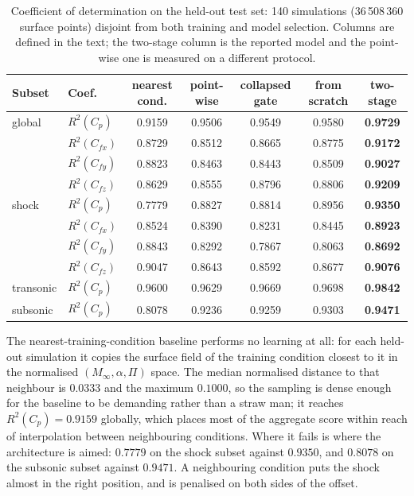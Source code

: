 \documentclass{WCCM-ECCOMAS_2026_Full_Paper}
\begin{document}
\begin{table}[htbp]
\centering
\caption{Coefficient of determination on the held-out test set: 140
  simulations (36\,508\,360 surface points) disjoint from both
  training and model selection.  Columns are defined in the text; the
  two-stage column is the reported model and the point-wise one is
  measured on a different protocol.}
\label{tab:results}
\setlength{\tabcolsep}{4pt}
\begin{tabular}{llccccc}
\toprule
\textbf{Subset} & \textbf{Coef.} & \textbf{nearest cond.}
  & \textbf{point-wise} & \textbf{collapsed gate}
  & \textbf{from scratch} & \textbf{two-stage} \\
\midrule
global    & $R^{2}(C_p)$    & 0.9159 & 0.9506 & 0.9549 & 0.9580 & \textbf{0.9729} \\
          & $R^{2}(C_{fx})$ & 0.8729 & 0.8512 & 0.8665 & 0.8775 & \textbf{0.9172} \\
          & $R^{2}(C_{fy})$ & 0.8823 & 0.8463 & 0.8443 & 0.8509 & \textbf{0.9027} \\
          & $R^{2}(C_{fz})$ & 0.8629 & 0.8555 & 0.8796 & 0.8806 & \textbf{0.9209} \\
\midrule
shock     & $R^{2}(C_p)$    & 0.7779 & 0.8827 & 0.8814 & 0.8956 & \textbf{0.9350} \\
          & $R^{2}(C_{fx})$ & 0.8524 & 0.8390 & 0.8231 & 0.8445 & \textbf{0.8923} \\
          & $R^{2}(C_{fy})$ & 0.8843 & 0.8292 & 0.7867 & 0.8063 & \textbf{0.8692} \\
          & $R^{2}(C_{fz})$ & 0.9047 & 0.8643 & 0.8592 & 0.8677 & \textbf{0.9076} \\
\midrule
transonic & $R^{2}(C_p)$    & 0.9600 & 0.9629 & 0.9669 & 0.9698 & \textbf{0.9842} \\
subsonic  & $R^{2}(C_p)$    & 0.8078 & 0.9236 & 0.9259 & 0.9303 & \textbf{0.9471} \\
\bottomrule
\end{tabular}
\end{table}

The nearest-training-condition baseline performs no learning at all:
for each held-out simulation it copies the surface field of the
training condition closest to it in the normalised
$(M_{\infty}, \alpha, \Pi)$ space.  The median normalised distance to
that neighbour is $0.0333$ and the maximum $0.1000$, so the sampling
is dense enough for the baseline to be demanding rather than a straw
man; it reaches $R^{2}(C_p) = 0.9159$ globally, which places most of
the aggregate score within reach of interpolation between neighbouring
conditions.  Where it fails is where the architecture is aimed:
$0.7779$ on the shock subset against $0.9350$, and $0.8078$ on the
subsonic subset against $0.9471$.  A neighbouring condition puts the
shock almost in the right position, and is penalised on both sides of
the offset.
\end{document}
